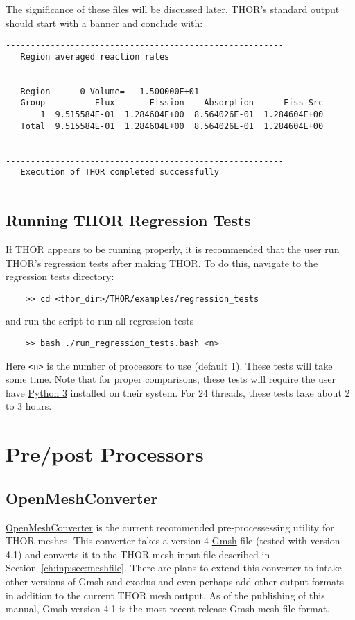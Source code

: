 The significance of these files will be discussed later.
\ac{THOR}'s standard output should start with a banner and conclude with:
\begin{verbatim}
--------------------------------------------------------
   Region averaged reaction rates
--------------------------------------------------------

-- Region --   0 Volume=   1.500000E+01
   Group          Flux       Fission    Absorption      Fiss Src
       1  9.515584E-01  1.284604E+00  8.564026E-01  1.284604E+00
   Total  9.515584E-01  1.284604E+00  8.564026E-01  1.284604E+00


--------------------------------------------------------
   Execution of THOR completed successfully
--------------------------------------------------------
\end{verbatim}

\subsection{Running THOR Regression Tests}

If \ac{THOR} appears to be running properly, it is recommended that the user run \ac{THOR}'s regression tests after making \ac{THOR}.
To do this, navigate to the regression tests directory:
\begin{verbatim}
    >> cd <thor_dir>/THOR/examples/regression_tests
\end{verbatim}
and run the script to run all regression tests
\begin{verbatim}
    >> bash ./run_regression_tests.bash <n>
\end{verbatim}
Here \verb"<n>" is the number of processors to use (default 1).
These tests will take some time.
Note that for proper comparisons, these tests will require the user have \href{https://www.python.org/downloads/}{Python 3} installed on their system.
For 24 threads, these tests take about 2 to 3 hours.

\section{Pre/post Processors}

\subsection{OpenMeshConverter}\label{ch:getstart:sec:preproc:subsec:meshconv}

\href{https://github.com/nfherrin/OpenMeshConverter}{OpenMeshConverter} is the current recommended pre-processessing utility for \ac{THOR} meshes.
This converter takes a version 4 \href{https://gmsh.info/}{Gmsh} file (tested with version 4.1) and converts it to the \ac{THOR} mesh input file described in Section~\ref{ch:inp:sec:meshfile}.
There are plans to extend this converter to intake other versions of Gmsh and exodus and even perhaps add other output formats in addition to the current \ac{THOR} mesh output.
As of the publishing of this manual, Gmsh version 4.1 is the most recent release Gmsh mesh file format.

